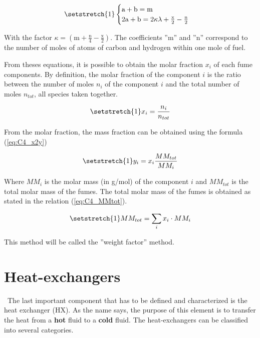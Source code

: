 \begin{equation}
    \setstretch{1}
    \begin{cases}
        \text{a} + \text{b} = \text{m} \\
        2\text{a} + \text{b} = 2\kappa\lambda + \frac{\text{x}}{2} - \frac{\text{n}}{2}
    \end{cases}\label{eq:C4_sysab2}
\end{equation}

With the factor \(\kappa = (\text{m}+\frac{\text{n}}{4}-\frac{\text{x}}{2})\). The coefficients ''m'' and ''n'' correspond to the number of moles of atoms of carbon and hydrogen within one mole of fuel.

From theses equations, it is possible to obtain the molar fraction \(x_i\) of each fume components. By definition, the molar fraction of the component \(i\) is the ratio between the number of moles \(n_i\) of the component \(i\) and the total number of moles \(n_{tot}\), all species taken together.

\begin{equation*}
    \setstretch{1}
    x_i = \frac{n_i}{n_{tot}}
\end{equation*}

From the molar fraction, the mass fraction can be obtained using the formula (\ref{eq:C4_x2y})

\begin{equation}
    \setstretch{1}
    y_i = x_i\frac{MM_{tot}}{MM_i} \label{eq:C4_x2y}
\end{equation}

Where \(MM_i\) is the molar mass (in g/mol) of the component \(i\) and \(MM_{tot}\) is the total molar mass of the fumes. The total molar mass of the fumes is obtained as stated in the relation (\ref{eq:C4_MMtot}).

\begin{equation}
    \setstretch{1}
    MM_{tot} = \sum_i x_i\cdot MM_i \label{eq:C4_MMtot}
\end{equation}

This method will be called the ''weight factor'' method.

\section{Heat-exchangers}
\quad\ The last important component that has to be defined and characterized is the heat exchanger (HX). As the name says, the purpose of this element is to transfer the heat from a \textbf{hot} fluid to a \textbf{cold} fluid. The heat-exchangers can be classified into several categories\cite{Ngendakumana2018}.

